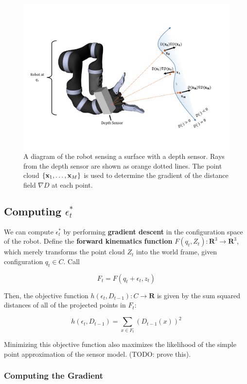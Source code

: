 \documentclass{article}
\begin{document}
\begin{figure}
	\centering
	\includegraphics[width=1.0\textwidth]{img/robot_reconstruct.pdf}
	\caption{A diagram of the robot sensing a surface with a depth sensor. Rays
	from the depth sensor are shown as orange dotted lines. The point cloud
	$\{\mathbf{x}_1, \ldots, \mathbf{x}_M\}$ is used to determine the gradient of the distance
	field $\nabla D$ at each point.}
	\label{fig:robot} 
\end{figure}

\subsection{Computing $\epsilon^*_t$}

We can compute $\epsilon^*_t$ by performing \textbf{gradient descent} in the
configuration space of the robot.  Define the \textbf{forward kinematics
function} $F(q_t, Z_t) : \mathbf{R}^3 \to \mathbf{R}^3$, which merely
transforms the point cloud $Z_t$ into the world frame, given configuration $q_t
\in C$. Call

$$ F_t = F(q_t + \epsilon_t, z_t) $$

Then, the objective function $h(\epsilon_t, D_{t-1}) : C \to \mathbf{R}$ is
given by the sum squared distances of all of the projected points in $F_t$:

$$ h(\epsilon_t, D_{t-1}) = \sum_{x \in F_t}\left(D_{t-1}(x)\right) ^2 $$

Minimizing this objective function also maximizes the likelihood of the simple point approximation of the sensor model. (TODO: prove this).

\subsubsection{Computing the Gradient}
\end{document}
